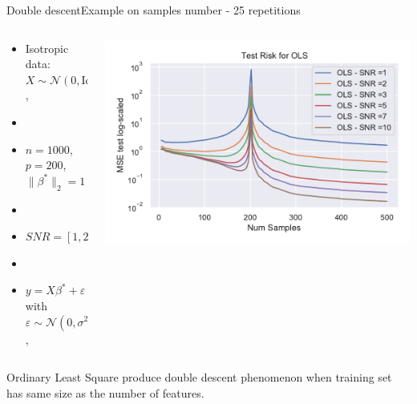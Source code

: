 \documentclass[10pt,aspectratio=43]{beamer}
\begin{document}
\begin{frame}{Double descent}{Example on samples number - 25 repetitions}
    \begin{columns}
        \begin{column}{0.46\textwidth}
            \begin{itemize}
                \item Isotropic data: $X\sim\mathcal{N}(0,\mathrm{Id})$,
                \item[]
                \item $n=1000$, $p=200$, $\|\beta^*\|_2=1$
                \item[]
                \item $SNR = [1, 2, 3, 5, 7, 10]$ \\
                \item[]
                \item $y = X\beta^*+\varepsilon$ with $\varepsilon\sim \mathcal{N}(0, \sigma^2\mathrm{Id})$,
            \end{itemize}
        \end{column}
        \begin{column}{0.7\textwidth}
            \begin{center}
             \includegraphics[width=1\textwidth]{ols_fail_log_snr.pdf}
             \end{center}
        \end{column}
        \end{columns}
        \begin{block}{}
            Ordinary Least Square produce double descent phenomenon when training set has same size as the number of features.
        \end{block}
\end{frame}
\end{document}
